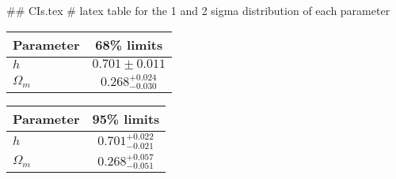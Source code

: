 ## CIs.tex
# latex table for the 1 and 2 sigma distribution of each parameter

\begin{tabular} { l  c}
 Parameter &  68\% limits\\
\hline
{\boldmath$h              $} & $0.701\pm 0.011            $\\
{\boldmath$\Omega_m       $} & $0.268^{+0.024}_{-0.030}   $\\
\hline
\end{tabular}

\begin{tabular} { l  c}
 Parameter &  95\% limits\\
\hline
{\boldmath$h              $} & $0.701^{+0.022}_{-0.021}   $\\
{\boldmath$\Omega_m       $} & $0.268^{+0.057}_{-0.051}   $\\
\hline
\end{tabular}
